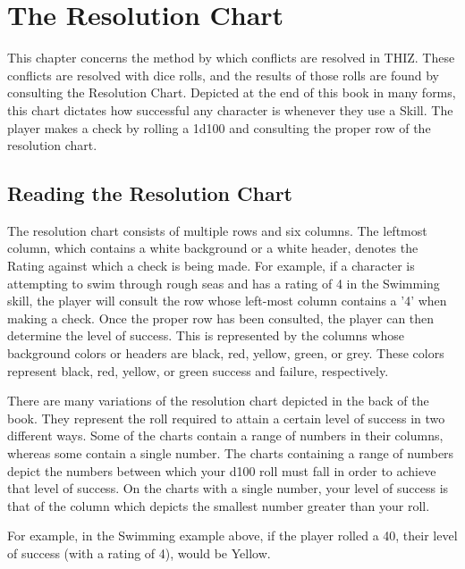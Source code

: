 \documentclass[oneside]{book}
\begin{document}
\chapter{The Resolution Chart}
This chapter concerns the method by which conflicts are resolved in THIZ. These conflicts are resolved with dice rolls, and the results of those rolls are found by consulting the Resolution Chart. Depicted at the end of this book in many forms, this chart dictates how successful any character is whenever they use a Skill. The player makes a check by rolling a 1d100 and consulting the proper row of the resolution chart.

\section{Reading the Resolution Chart}
The resolution chart consists of multiple rows and six columns. The leftmost column, which contains a white background or a white header, denotes the Rating against which a check is being made. For example, if a character is attempting to swim through rough seas and has a rating of 4 in the Swimming skill, the player will consult the row whose left-most column contains a '4' when making a check. Once the proper row has been consulted, the player can then determine the level of success. This is represented by the columns whose background colors or headers are black, red, yellow, green, or grey. These colors represent black, red, yellow, or green success and failure, respectively. 

There are many variations of the resolution chart depicted in the back of the book. They represent the roll required to attain a certain level of success in two different ways. Some of the charts contain a range of numbers in their columns, whereas some contain a single number. The charts containing a range of numbers depict the numbers between which your d100 roll must fall in order to achieve that level of success. On the charts with a single number, your level of success is that of the column which depicts the smallest number greater than your roll. 

For example, in the Swimming example above, if the player rolled a 40, their level of success (with a rating of 4), would be Yellow.
\end{document}
